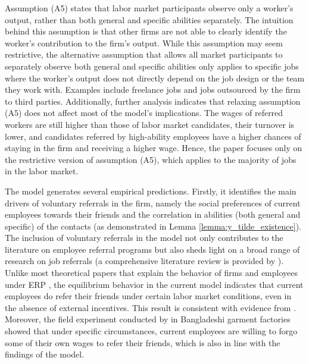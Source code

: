 \documentclass[12pt]{article}
\begin{document}
Assumption (A5) states that labor market participants observe only a worker's output, rather than both general and specific abilities separately. The intuition behind this assumption is that other firms are not able to clearly identify the worker's contribution to the firm's output. While this assumption may seem restrictive, the alternative assumption that allows all market participants to separately observe both general and specific abilities only applies to specific jobs where the worker's output does not directly depend on the job design or the team they work with. Examples include freelance jobs and jobs outsourced by the firm to third parties. Additionally, further analysis indicates that relaxing assumption (A5) does not affect most of the model's implications. The wages of referred workers are still higher than those of labor market candidates, their turnover is lower, and candidates referred by high-ability employees have a higher chances of staying in the firm and receiving a higher wage. Hence, the paper focuses only on the restrictive version of assumption (A5), which applies to the majority of jobs in the labor market.

The model generates several empirical predictions. Firstly, it identifies the main drivers of voluntary referrals in the firm, namely the social preferences of current employees towards their friends and the correlation in abilities (both general and specific) of the contacts (as demonstrated in Lemma \ref{lemma:y_tilde_existence}). The inclusion of voluntary referrals in the model not only contributes to the literature on employee referral programs but also sheds light on a broad range of research on job referrals (a comprehensive literature review is provided by \cite{topa2011labor}). Unlike most theoretical papers that explain the behavior of firms and employees under ERP \citep{beaman2012gets, ekinci2016employee}, the equilibrium behavior in the current model indicates that current employees do refer their friends under certain labor market conditions, even in the absence of external incentives. This result is consistent with evidence from \cite{holzer1987hiring, granovetter1995getting, pellizzari2010friends, lester2021heterogeneous}. Moreover, the field experiment conducted by \cite{heath2018firms} in Bangladeshi garment factories showed that under specific circumstances, current employees are willing to forgo some of their own wages to refer their friends, which is also in line with the findings of the model.
\end{document}
